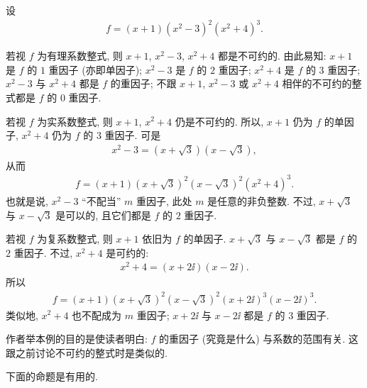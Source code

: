 \begin{example}
    设
    \begin{align*}
        f = (x + 1) (x^2 - 3)^2 (x^2 + 4)^3.
    \end{align*}

    若视 $f$ 为有理系数整式, 则 $x+1$, $x^2 - 3$, $x^2 + 4$ 都是不可约的. 由此易知: $x+1$ 是 $f$ 的 $1$ 重因子 (亦即单因子); $x^2 - 3$ 是 $f$ 的 $2$ 重因子; $x^2 + 4$ 是 $f$ 的 $3$ 重因子; $x^2 - 3$ 与 $x^2 + 4$ 都是 $f$ 的重因子; 不跟 $x+1$, $x^2 - 3$ 或 $x^2 + 4$ 相伴的不可约的整式都是 $f$ 的 $0$ 重因子.

    若视 $f$ 为实系数整式, 则 $x+1$, $x^2+4$ 仍是不可约的. 所以, $x+1$ 仍为 $f$ 的单因子, $x^2+4$ 仍为 $f$ 的 $3$ 重因子. 可是
    \begin{align*}
        x^2 - 3 = (x + \sqrt{3}) (x - \sqrt{3}),
    \end{align*}
    从而
    \begin{align*}
        f = (x + 1)(x + \sqrt{3})^2 (x - \sqrt{3})^2 (x^2 + 4)^3.
    \end{align*}
    也就是说, $x^2 - 3$ ``不配当'' $m$ 重因子, 此处 $m$ 是任意的非负整数. 不过, $x + \sqrt{3}$ 与 $x - \sqrt{3}$ 是可以的, 且它们都是 $f$ 的 $2$ 重因子.

    若视 $f$ 为复系数整式, 则 $x+1$ 依旧为 $f$ 的单因子. $x + \sqrt{3}$ 与 $x - \sqrt{3}$ 都是 $f$ 的 $2$ 重因子. 不过, $x^2 + 4$ 是可约的:
    \begin{align*}
        x^2 + 4 = (x + 2\ii) (x - 2\ii).
    \end{align*}
    所以
    \begin{align*}
        f = (x + 1)(x + \sqrt{3})^2 (x - \sqrt{3})^2 (x + 2\ii)^3 (x - 2\ii)^3.
    \end{align*}
    类似地, $x^2 + 4$ 也不配成为 $m$ 重因子; $x + 2\ii$ 与 $x - 2\ii$ 都是 $f$ 的 $3$ 重因子.

    作者举本例的目的是使读者明白: $f$ 的重因子 (究竟是什么) 与系数的范围有关. 这跟之前讨论不可约的整式时是类似的.
\end{example}

下面的命题是有用的.

